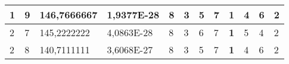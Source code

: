 \documentclass[conference]{IEEEtran}
\begin{document}
\begin{table*}[]
\begin{tabular}{|llll|llllllll|}
\multicolumn{1}{|l|}{1}                                                              & \multicolumn{1}{l|}{9}                                                                 & \multicolumn{1}{l|}{146,7666667}                                                           & 1,9377E-28                              & \multicolumn{1}{l|}{8}                                                           & \multicolumn{1}{l|}{3}                                                           & \multicolumn{1}{l|}{5}                                                           & \multicolumn{1}{l|}{7}                                                           & \multicolumn{1}{l|}{\textbf{1}}                                                  & \multicolumn{1}{l|}{4}                                                           & \multicolumn{1}{l|}{6}                                                           & 2                                   \\ \hline
\multicolumn{1}{|l|}{2}                                                              & \multicolumn{1}{l|}{7}                                                                 & \multicolumn{1}{l|}{145,2222222}                                                           & 4,0863E-28                              & \multicolumn{1}{l|}{8}                                                           & \multicolumn{1}{l|}{3}                                                           & \multicolumn{1}{l|}{6}                                                           & \multicolumn{1}{l|}{7}                                                           & \multicolumn{1}{l|}{\textbf{1}}                                                  & \multicolumn{1}{l|}{5}                                                           & \multicolumn{1}{l|}{4}                                                           & 2                                   \\ \hline
\multicolumn{1}{|l|}{2}                                                              & \multicolumn{1}{l|}{8}                                                                 & \multicolumn{1}{l|}{140,7111111}                                                           & 3,6068E-27                              & \multicolumn{1}{l|}{8}                                                           & \multicolumn{1}{l|}{3}                                                           & \multicolumn{1}{l|}{5}                                                           & \multicolumn{1}{l|}{7}                                                           & \multicolumn{1}{l|}{\textbf{1}}                                                  & \multicolumn{1}{l|}{4}                                                           & \multicolumn{1}{l|}{6}                                                           & 2                                   \\ \hline

\end{tabular}
\end{table*}
\end{document}
